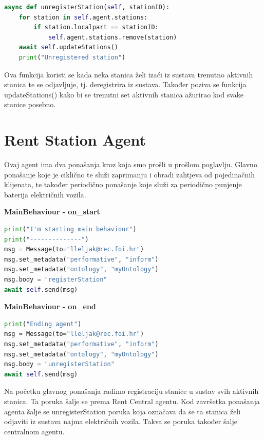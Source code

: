 \documentclass{foi}
\begin{document}
\begin{lstlisting}[language=Python]
async def unregisterStation(self, stationID):
	for station in self.agent.stations:
		if station.localpart == stationID:
			self.agent.stations.remove(station)
	await self.updateStations()
	print("Unregistered station")
\end{lstlisting}

Ova funkcija koristi se kada neka stanica želi izaći iz sustava trenutno aktivnih stanica te se odjavljuje, tj. deregistrira iz sustava. Također poziva se funkcija updateStations() kako bi se trenutni set aktivnih stanica ažurirao kod svake stanice posebno.

\section{Rent Station Agent}

Ovaj agent ima dva ponašanja kroz koja smo prošli u prošlom poglavlju. Glavno ponašanje koje je ciklično te služi zaprimanju i obradi zahtjeva od pojedinačnih klijenata, te također periodično ponašanje koje služi za periodično punjenje baterija električnih vozila.

\begin{flushleft}\textbf{MainBehaviour - on\_start}\end{flushleft}

\begin{lstlisting}[language=Python]
print("I'm starting main behaviour")
print("--------------")
msg = Message(to="lleljak@rec.foi.hr")
msg.set_metadata("performative", "inform")
msg.set_metadata("ontology", "myOntology")
msg.body = "registerStation"
await self.send(msg)
\end{lstlisting}

\begin{flushleft}\textbf{MainBehaviour - on\_end}\end{flushleft}

\begin{lstlisting}[language=Python]
print("Ending agent")
msg = Message(to="lleljak@rec.foi.hr")
msg.set_metadata("performative", "inform")
msg.set_metadata("ontology", "myOntology")
msg.body = "unregisterStation"
await self.send(msg)
\end{lstlisting}

Na početku glavnog ponašanja radimo registraciju stanice u sustav svih aktivnih stanica. Ta poruka šalje se prema Rent Central agentu. Kod završetka ponašanja agenta šalje se unregisterStation poruka koja označava da se ta stanica želi odjaviti iz sustava najma električnih vozila. Takva se poruka također šalje centralnom agentu.
\end{document}

